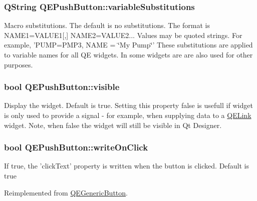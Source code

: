 \hypertarget{classQEPushButton_a9112669af4b7922193ef03e8d9636f9c}{
\subsubsection[{variableSubstitutions}]{\setlength{\rightskip}{0pt plus 5cm}QString QEPushButton::variableSubstitutions}}
\label{classQEPushButton_a9112669af4b7922193ef03e8d9636f9c}
Macro substitutions. The default is no substitutions. The format is NAME1=VALUE1\mbox{[},\mbox{]} NAME2=VALUE2... Values may be quoted strings. For example, 'PUMP=PMP3, NAME = \char`\"{}My Pump\char`\"{}' These substitutions are applied to variable names for all QE widgets. In some widgets are are also used for other purposes. \hypertarget{classQEPushButton_a090ec7fbc7112a38ceb7c91e651f9770}{
\subsubsection[{visible}]{\setlength{\rightskip}{0pt plus 5cm}bool QEPushButton::visible}}
\label{classQEPushButton_a090ec7fbc7112a38ceb7c91e651f9770}
Display the widget. Default is true. Setting this property false is usefull if widget is only used to provide a signal -\/ for example, when supplying data to a \hyperlink{classQELink}{QELink} widget. Note, when false the widget will still be visible in Qt Designer. \hypertarget{classQEPushButton_a728ad7d31319f5f82548cd7d1bc65803}{
\subsubsection[{writeOnClick}]{\setlength{\rightskip}{0pt plus 5cm}bool QEPushButton::writeOnClick}}
\label{classQEPushButton_a728ad7d31319f5f82548cd7d1bc65803}
If true, the 'clickText' property is written when the button is clicked. Default is true 

Reimplemented from \hyperlink{classQEGenericButton}{QEGenericButton}.


